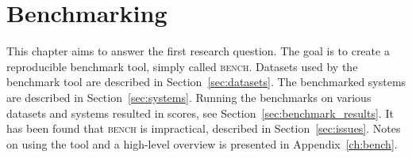 \chapter{Benchmarking}
\label{ch:benchmarking}

This chapter aims to answer the first research question.
The goal is to create a reproducible benchmark tool, simply called \textsc{bench}.
Datasets used by the benchmark tool are described in Section~\ref{sec:datasets}.
The benchmarked systems are described in Section~\ref{sec:systems}.
Running the benchmarks on various datasets and systems resulted in scores, see Section~\ref{sec:benchmark_results}.
It has been found that \textsc{bench} is impractical, described in Section~\ref{sec:issues}.
Notes on using the tool and a high-level overview is presented in Appendix~\ref{ch:bench}.








